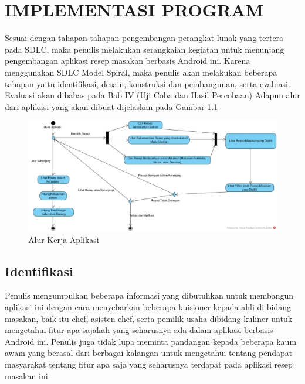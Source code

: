 
\chapter{IMPLEMENTASI PROGRAM}

Sesuai dengan tahapan-tahapan pengembangan perangkat lunak yang tertera pada SDLC, maka penulis melakukan serangkaian kegiatan untuk menunjang pengembangan aplikasi resep masakan berbasis Android ini. Karena menggunakan SDLC Model Spiral, maka penulis akan melakukan beberapa tahapan yaitu identifikasi, desain, konstruksi dan pembangunan, serta evaluasi. Evaluasi akan dibahas pada Bab IV (Uji Coba dan Hasil Percobaan) Adapun alur dari aplikasi yang akan dibuat dijelaskan pada Gambar \ref{alur_app}

\begin{figure}[H]
	\centering
	\includegraphics[width=1\textwidth]{gambar/activity_diagram_v2}
	\caption{Alur Kerja Aplikasi}
	\label{alur_app}
\end{figure}


\section{Identifikasi}
	Penulis mengumpulkan beberapa informasi yang dibutuhkan untuk membangun aplikasi ini dengan cara menyebarkan beberapa kuisioner kepada ahli di bidang masakan, baik itu chef, asisten chef, serta pemilik usaha dibidang kuliner untuk mengetahui fitur apa sajakah yang seharusnya ada dalam aplikasi berbasis Android ini. Penulis juga tidak lupa meminta pandangan kepada beberapa kaum awam yang berasal dari berbagai kalangan untuk mengetahui tentang pendapat masyarakat tentang fitur apa saja yang seharusnya terdapat pada aplikasi resep masakan ini. 
	
